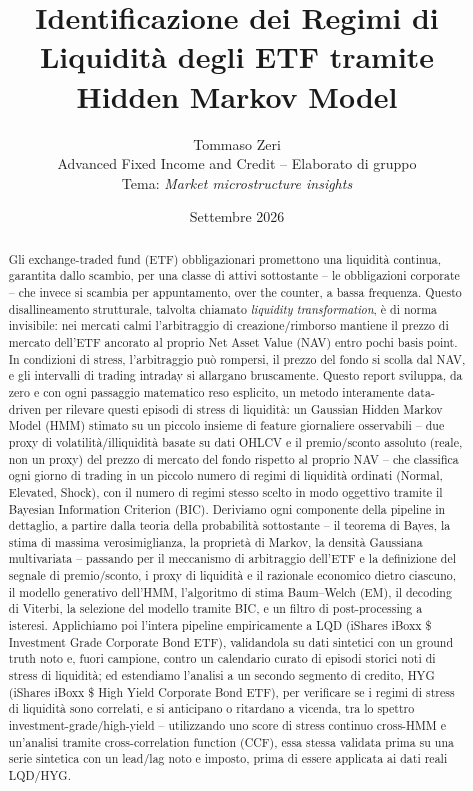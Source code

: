 \documentclass[11pt]{article}
\title{Identificazione dei Regimi di Liquidit\`a degli ETF tramite Hidden Markov Model}
\author{Tommaso Zeri \\ \small Advanced Fixed Income and Credit -- Elaborato di gruppo \\ \small Tema: \emph{Market microstructure insights}}
\date{Settembre 2026}
\theoremstyle{definition}
\theoremstyle{remark}
\begin{document}
\maketitle

\begin{abstract}
\noindent Gli exchange-traded fund (ETF) obbligazionari promettono una liquidit\`a continua, garantita dallo scambio, per una classe di attivi sottostante -- le obbligazioni corporate -- che invece si scambia per appuntamento, over the counter, a bassa frequenza. Questo disallineamento strutturale, talvolta chiamato \emph{liquidity transformation}, \`e di norma invisibile: nei mercati calmi l'arbitraggio di creazione/rimborso mantiene il prezzo di mercato dell'ETF ancorato al proprio Net Asset Value (NAV) entro pochi basis point. In condizioni di stress, l'arbitraggio pu\`o rompersi, il prezzo del fondo si scolla dal NAV, e gli intervalli di trading intraday si allargano bruscamente. Questo report sviluppa, da zero e con ogni passaggio matematico reso esplicito, un metodo interamente data-driven per rilevare questi episodi di stress di liquidit\`a: un Gaussian Hidden Markov Model (HMM) stimato su un piccolo insieme di feature giornaliere osservabili -- due proxy di volatilit\`a/illiquidit\`a basate su dati OHLCV e il premio/sconto assoluto (reale, non un proxy) del prezzo di mercato del fondo rispetto al proprio NAV -- che classifica ogni giorno di trading in un piccolo numero di regimi di liquidit\`a ordinati (Normal, Elevated, Shock), con il numero di regimi stesso scelto in modo oggettivo tramite il Bayesian Information Criterion (BIC). Deriviamo ogni componente della pipeline in dettaglio, a partire dalla teoria della probabilit\`a sottostante -- il teorema di Bayes, la stima di massima verosimiglianza, la propriet\`a di Markov, la densit\`a Gaussiana multivariata -- passando per il meccanismo di arbitraggio dell'ETF e la definizione del segnale di premio/sconto, i proxy di liquidit\`a e il razionale economico dietro ciascuno, il modello generativo dell'HMM, l'algoritmo di stima Baum--Welch (EM), il decoding di Viterbi, la selezione del modello tramite BIC, e un filtro di post-processing a isteresi. Applichiamo poi l'intera pipeline empiricamente a LQD (iShares iBoxx \$ Investment Grade Corporate Bond ETF), validandola su dati sintetici con un ground truth noto e, fuori campione, contro un calendario curato di episodi storici noti di stress di liquidit\`a; ed estendiamo l'analisi a un secondo segmento di credito, HYG (iShares iBoxx \$ High Yield Corporate Bond ETF), per verificare se i regimi di stress di liquidit\`a sono correlati, e si anticipano o ritardano a vicenda, tra lo spettro investment-grade/high-yield -- utilizzando uno score di stress continuo cross-HMM e un'analisi tramite cross-correlation function (CCF), essa stessa validata prima su una serie sintetica con un lead/lag noto e imposto, prima di essere applicata ai dati reali LQD/HYG.
\end{abstract}
\end{document}
